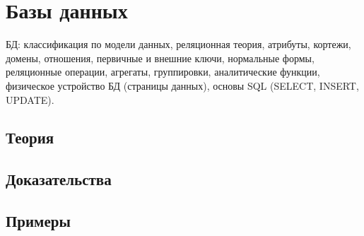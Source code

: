 
\section{Базы данных}
\label{sec:2.3b.09-databases}

\begin{ticket}
БД: классификация по модели данных, реляционная теория, атрибуты, кортежи, домены, отношения, первичные и внешние ключи, нормальные формы, реляционные операции, агрегаты, группировки, аналитические функции, физическое устройство БД (страницы данных), основы SQL (SELECT, INSERT, UPDATE).
\end{ticket}

\subsection*{Теория}

\subsection*{Доказательства}

\subsection*{Примеры}
